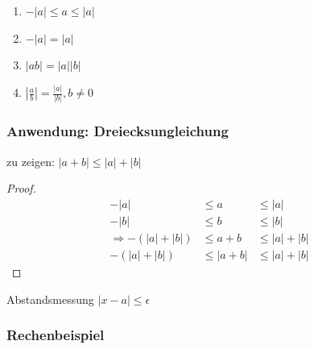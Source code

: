 \begin{enumerate}
 \item $-|a|\leq a \leq |a|$
 \item $-|a| = |a|$
 \item $|ab| = |a||b|$
 \item $\displaystyle\left|\frac{a}{b}\right| = \frac{|a|}{|b|}, b\neq 0$
\end{enumerate}

\subsubsection*{Anwendung: Dreiecksungleichung}
zu zeigen: $|a+b| \leq |a|+|b|$
\begin{proof}
  \begin{align*}
    -|a|&\leq a &\leq |a| \\
    -|b|&\leq b &\leq |b| \\
    \Rightarrow -(|a|+|b|)&\leq a+b &\leq |a|+|b| \\
    -(|a|+|b|)&\leq |a+b| &\leq |a|+|b|
  \end{align*}
\end{proof}

Abstandsmessung $|x-a| \leq \epsilon$

\subsubsection*{Rechenbeispiel}


